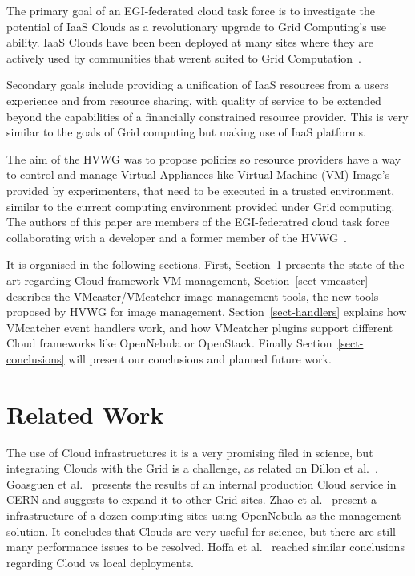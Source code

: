 \documentclass{cai}
\begin{document}
The primary goal of an EGI-federated cloud task force is to investigate the potential of IaaS Clouds as a revolutionary upgrade to Grid Computing's use ability. 
IaaS Clouds have been been deployed at many sites where they are actively used by communities that werent suited to Grid Computation~\cite{gridcloud}. 

Secondary goals include providing a unification of IaaS resources from a users experience and from resource sharing, with quality of service to be extended beyond the capabilities of a financially constrained resource provider.
This is very similar to the goals of Grid computing but making use of IaaS platforms.

The aim of the HVWG was to propose policies so resource providers have a way to control and manage Virtual Appliances like Virtual Machine (VM) Image's provided by experimenters, that need to be executed in a trusted environment, similar to the current computing environment provided under Grid computing. 
The authors of this paper are members of the EGI-federatred cloud task force collaborating with a developer and a former member of the HVWG~\cite{hepix}.

It is organised in the following sections. First, Section~\ref{sect-relatedwork} presents the state of the art regarding Cloud framework VM management, Section~\ref{sect-vmcaster} describes the VMcaster/VMcatcher image management tools, the new tools proposed by HVWG for image management. 
Section~\ref{sect-handlers} explains how VMcatcher event handlers work, and how VMcatcher plugins support different Cloud frameworks like OpenNebula or OpenStack.
Finally Section~\ref{sect-conclusions} will present our conclusions and planned future work.

\section{Related Work}
\label{sect-relatedwork}
The use of Cloud infrastructures it is a very promising filed in science, but integrating Clouds with the Grid is a challenge, as related on Dillon et al.~\cite{Dillon2010}. Goasguen et al.~\cite{Goasguen2012} presents the results of an internal production Cloud service in CERN and suggests to expand it to other Grid sites. Zhao et al.~\cite{Zhao2012} present a infrastructure of a dozen computing sites using OpenNebula as the management solution. It concludes that Clouds are very useful for science, but there are still many performance issues to be resolved. Hoffa et al.~\cite{Hoffa2008} reached similar conclusions regarding Cloud vs local deployments.
\end{document}
